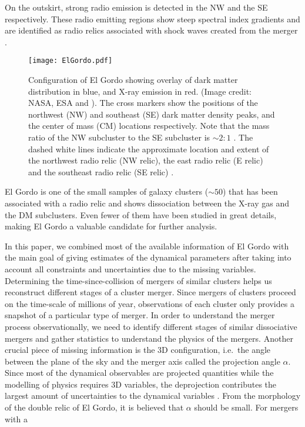 On the outskirt, strong radio emission is detected in
the NW and the SE respectively. These radio emitting regions show steep spectral
index gradients and are identified as radio relics associated with shock waves
created from the merger \citep{L13}. 
\begin{figure}
	\texttt{[image: ElGordo.pdf]}
	\caption{Configuration of El Gordo showing overlay of dark
		matter distribution in blue, and X-ray emission in red. 
		(Image credit: NASA, ESA and \citealt{Jee13}). 
		The cross markers show the positions of the northwest (NW) and
		southeast (SE) dark matter density peaks, and the center of mass (CM)
		locations respectively. Note that the mass ratio of the NW subcluster
		to the SE subcluster is $\sim 2:1$ \citep{Jee13}. 
		The dashed white lines indicate the approximate location and extent of the northwest radio relic (NW relic), the east radio relic (E relic) and the
		southeast radio relic (SE relic) \citep{L13}.
		\label{fig:config}}
\end{figure}
El Gordo is one of the small samples of galaxy clusters ($\sim50$) that has
been associated with a radio relic and shows dissociation between the X-ray
gas and the DM subclusters. Even fewer of them have been studied in
great details, making El Gordo a valuable candidate for further analysis.\par 
In this paper, we combined most of the available information of El Gordo
with the main goal of giving estimates of
the dynamical parameters after taking into account all
constraints and uncertainties due to the missing variables.
Determining the time-since-collision of mergers of similar clusters helps
us reconstruct different stages of a cluster merger.
Since mergers of clusters proceed on the time-scale of millions of year,
observations of each cluster only provides a snapshot of a particular type
of merger. In order to understand the merger process observationally, 
we need to identify different stages of similar dissociative mergers and
gather statistics to understand the physics of the mergers.  
Another crucial piece of missing information is the 3D
configuration, i.e.\ the angle between the plane of the sky and the merger
axis called the projection angle $\alpha$. Since most of the dynamical
observables are projected quantities while the modelling of physics
requires 3D
variables, the deprojection contributes the
largest amount of uncertainties to the dynamical variables .
From the morphology of the double relic of El Gordo, it is believed that
$\alpha$ should be small. For mergers with a

